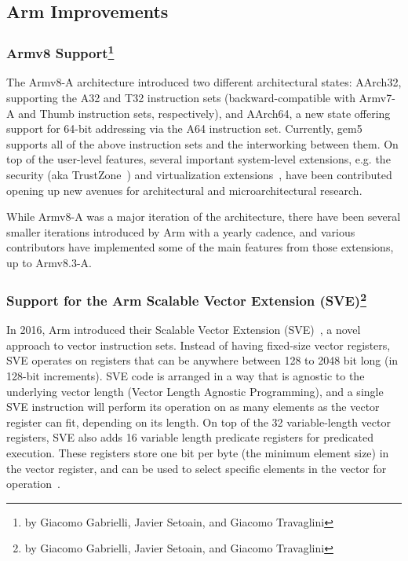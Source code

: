 \subsection[Arm Improvements]{Arm Improvements}
\label{sec:arm}

\subsubsection[Armv8 Support]{Armv8 Support\footnote{by Giacomo Gabrielli, Javier Setoain, and Giacomo Travaglini}}

The Armv8-A architecture introduced two different architectural states:
AArch32, supporting the A32 and T32 instruction sets (backward-compatible with
Armv7-A and Thumb instruction sets, respectively), and AArch64, a new
state offering support for 64-bit addressing via the A64 instruction set. Currently, gem5
supports all of the above instruction sets and the interworking
between them.
On top of the user-level features, several important system-level extensions, e.g. the
security (aka TrustZone\textregistered~\cite{ArmTustZone}) and virtualization extensions~\cite{ArmARM}, have been contributed opening up new avenues for architectural and microarchitectural research.

While Armv8-A was a major iteration of the architecture, there have been
several smaller iterations introduced by Arm with a yearly cadence, and various
contributors have implemented some of the main features from those extensions,
up to Armv8.3-A.

\subsubsection[Support for the Arm Scalable Vector Extension (SVE)]{Support for the Arm Scalable Vector Extension (SVE)\footnote{by Giacomo Gabrielli, Javier Setoain, and Giacomo Travaglini}}

In 2016, Arm introduced their Scalable Vector Extension (SVE)~\cite{ArmARM}, a
novel approach to vector instruction sets. Instead of having fixed-size vector
registers, SVE operates on registers that can be anywhere between 128 to 2048
bit long (in 128-bit increments). SVE code is arranged in a way that is agnostic to the
underlying vector length (Vector Length Agnostic Programming), and a single SVE
instruction will perform its operation on as many elements as the vector
register can fit, depending on its length. On top of the 32 variable-length
vector registers, SVE also adds 16 variable length predicate registers for
predicated execution. These registers store one bit per byte (the minimum
element size) in the vector register, and can be used to select specific
elements in the vector for operation~\cite{white-paper-on-SVE-and-VLA-programming}.

